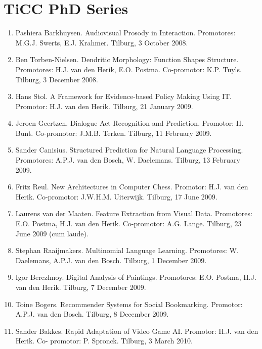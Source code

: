 {}

\chapter*{TiCC PhD Series}

\begin{enumerate}
\itemsep0em
\footnotesize
\item{Pashiera Barkhuysen. Audiovisual Prosody in Interaction. Promotores: 
M.G.J.  Swerts, E.J.
Krahmer. Tilburg, 3 October 2008.}
\item{ Ben Torben-Nielsen. Dendritic Morphology: Function Shapes Structure.  
Promotores: H.J. van
den Herik, E.O. Postma. Co-promotor: K.P. Tuyls. Tilburg, 3 December 2008.}
\item{ Hans Stol. A Framework for Evidence-based Policy Making Using IT.  
Promotor: H.J. van den
Herik. Tilburg, 21 January 2009.}
\item{ Jeroen Geertzen. Dialogue Act Recognition and Prediction. Promotor: H.  
Bunt.  Co-promotor:
J.M.B. Terken. Tilburg, 11 February 2009.}
\item{ Sander Canisius. Structured Prediction for Natural Language Processing.  
Promotores: A.P.J. van
den Bosch, W. Daelemans. Tilburg, 13 February 2009.}
\item{ Fritz Reul. New Architectures in Computer Chess. Promotor: H.J. van den 
Herik. Co-promotor:
J.W.H.M. Uiterwijk. Tilburg, 17 June 2009.}
\item{ Laurens van der Maaten. Feature Extraction from Visual Data. Promotores: 
E.O.  Postma, H.J.
van den Herik. Co-promotor: A.G. Lange. Tilburg, 23 June 2009 (cum laude).}
\item{ Stephan Raaijmakers. Multinomial Language Learning. Promotores: W.  
Daelemans, A.P.J. van
den Bosch. Tilburg, 1 December 2009.}
\item{ Igor Berezhnoy. Digital Analysis of Paintings. Promotores: E.O. Postma, 
H.J.  van den Herik.
Tilburg, 7 December 2009.}
\item{ Toine Bogers. Recommender Systems for Social Bookmarking. Promotor: 
A.P.J.  van den Bosch.
Tilburg, 8 December 2009.}

\item{ Sander Bakkes. Rapid Adaptation of Video Game AI. Promotor: H.J. van den 
Herik. Co-
promotor: P. Spronck. Tilburg, 3 March 2010.}


\end{enumerate}
